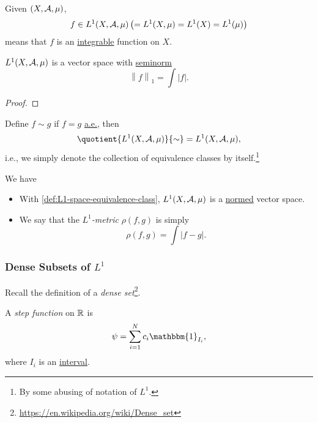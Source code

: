 \begin{definition}[\(L^1\) Space]\label{def:L1-space}
	Given \((X, \mathcal{\MakeUppercase{a}} , \mu )\),
	\[
		f\in L^1(X, \mathcal{\MakeUppercase{a}} , \mu )\left( = L^1(X, \mu ) = L^1(X) = L^1(\mu )\right)
	\]
	means that \(f\) is an \hyperref[def:integrable]{integrable} function on \(X\).
\end{definition}

\begin{lemma}
	\(L^1(X, \mathcal{\MakeUppercase{a}} , \mu )\) is a vector space with \hyperref[def:seminorm]{seminorm}
	\[
		\left\lVert f\right\rVert _1 = \int \left\vert f \right\vert .
	\]
\end{lemma}
\begin{proof}
\end{proof}

\begin{definition}\label{def:L1-space-equivalence-class}
	Define \(f\sim g\) if \(f = g\) \hyperref[def:mu-almost-everywhere]{a.e.}, then
	\[
		\quotient{L^1(X, \mathcal{\MakeUppercase{a}} , \mu )}{\sim} = L^1(X, \mathcal{\MakeUppercase{a}} , \mu ),
	\]
	i.e., we simply denote the collection of equivalence classes by itself.\footnote{By some abusing of notation of \(L^1\).}
\end{definition}
\begin{remark}
	We have
	\begin{itemize}
		\item With \autoref{def:L1-space-equivalence-class}, \(L^1(X, \mathcal{\MakeUppercase{a}} , \mu )\) is a \hyperref[def:norm]{normed} vector space.
		\item \label{def:L-1-metric} We say that the \emph{\(L^1\)-metric} \(\rho (f, g)\) is simply
		      \[
			      \rho (f, g) = \int \left\vert f - g \right\vert.
		      \]
	\end{itemize}
\end{remark}

\subsubsection{Dense Subsets of \(L^1\)}
\begin{note}
	Recall the definition of a \emph{dense set}\footnote{\url{https://en.wikipedia.org/wiki/Dense_set}}.
\end{note}

\begin{definition}\label{def:step-function}
	A \emph{step function} on \(\mathbb{\MakeUppercase{r}} \) is
	\[
		\psi = \sum\limits_{i=1}^{N} c_{i}\mathbbm{1}_{I_{i}},
	\]
	where \(I_{i}\) is an \underline{interval}.
\end{definition}

